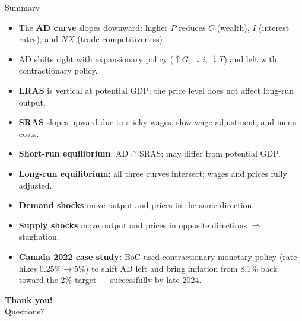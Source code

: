 \documentclass[aspectratio=169]{beamer}
\begin{document}
\begin{frame}{Summary}
\transfade
\begin{itemize}[<+->]
  \item The \textbf{AD curve} slopes downward: higher $P$ reduces $C$ (wealth), $I$ (interest rates), and $NX$ (trade competitiveness).
  \item AD shifts right with expansionary policy ($\uparrow G$, $\downarrow i$, $\downarrow T$) and left with contractionary policy.
  \item \textbf{LRAS} is vertical at potential GDP; the price level does not affect long-run output.
  \item \textbf{SRAS} slopes upward due to sticky wages, slow wage adjustment, and menu costs.
  \item \textbf{Short-run equilibrium}: AD $\cap$ SRAS; may differ from potential GDP.
  \item \textbf{Long-run equilibrium}: all three curves intersect; wages and prices fully adjusted.
  \item \textbf{Demand shocks} move output and prices in the same direction.
  \item \textbf{Supply shocks} move output and prices in opposite directions $\Rightarrow$ stagflation.
  \item \textbf{Canada 2022 case study:} BoC used contractionary monetary policy (rate hikes 0.25\%$\to$5\%) to shift AD left and bring inflation from 8.1\% back toward the 2\% target --- successfully by late 2024.
\end{itemize}
\end{frame}

\begin{frame}
\centering
\Huge \textbf{Thank you!}\\[1em]
\large Questions?
\end{frame}
\end{document}
